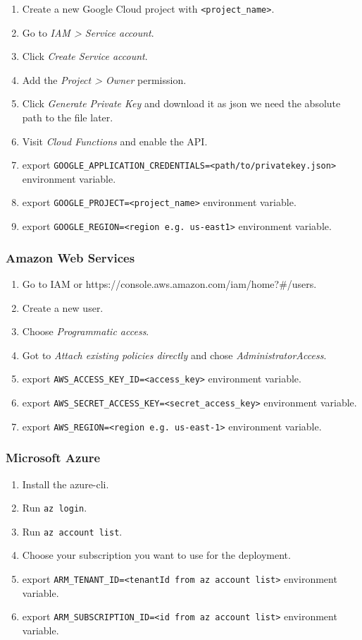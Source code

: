 \documentclass[../main.tex]{subfiles}
\begin{document}
\begin{enumerate}
\item Create a new Google Cloud project with \texttt{<project\_name>}.
\item Go to \textit{IAM > Service account}.
\item Click \textit{Create Service account}.
\item Add the \textit{Project > Owner} permission.
\item Click \textit{Generate Private Key} and download it as json we need the absolute path to the file later.
\item Visit \textit{Cloud Functions} and enable the API.
\item export \texttt{GOOGLE\_APPLICATION\_CREDENTIALS=<path/to/privatekey.json>} environment variable.
\item export \texttt{GOOGLE\_PROJECT=<project\_name>} environment variable.
\item export \texttt{GOOGLE\_REGION=<region e.g. us-east1>} environment variable.
\end{enumerate}

\subsubsection{Amazon Web Services}\label{sec:providersetupaws}
\begin{enumerate}
\item Go to IAM or https://console.aws.amazon.com/iam/home?\#/users.
\item Create a new user.
\item Choose \textit{Programmatic access}.
\item Got to \textit{Attach existing policies directly} and chose \textit{AdministratorAccess}.
\item export \texttt{AWS\_ACCESS\_KEY\_ID=<access\_key>} environment variable.
\item export \texttt{AWS\_SECRET\_ACCESS\_KEY=<secret\_access\_key>} environment variable.
\item export \texttt{AWS\_REGION=<region e.g. us-east-1>} environment variable.
\end{enumerate}

\subsubsection{Microsoft Azure}\label{sec:providersetupazure}
\begin{enumerate}
\item Install the azure-cli.
\item Run \texttt{az login}.
\item Run \texttt{az account list}.
\item Choose your subscription you want to use for the deployment.
\item export \texttt{ARM\_TENANT\_ID=<tenantId from az account list>} environment variable.
\item export \texttt{ARM\_SUBSCRIPTION\_ID=<id from az account list>} environment variable.
\end{enumerate}
\end{document}
